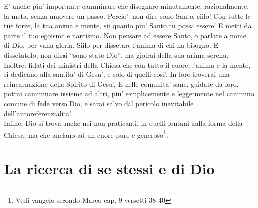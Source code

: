 E' anche piu' importante camminare che disegnare minutamente, razionalmente, la meta, senza muovere un passo.  Percio': non dire sono Santo, siilo!  Con tutte le tue forze, la tua anima e mente, sii quanto piu' Santo tu possa essere! E metti da parte il tuo egoismo e narcismo.  Non pensare ad essere Santo, o parlare a nome di Dio, per vana gloria. Siilo per dissetare l'anima di chi ha bisogno. E dissetatolo, non dirai ``sono stato Dio'', ma gioirai della sua anima serena.\\
Inoltre: fidati dei ministri della Chiesa che con tutto il cuore, l'anima e la mente, si dedicano alla santita' di Gesu', e solo di quelli cosi'. In loro troverai una reincarnazione dello Spirito di Gesu'. E nelle comunita' sane, guidate da loro, potrai camminare insieme ad altri, piu' semplicemente e leggermente nel cammino comune di fede verso Dio, e sarai salvo dal pericolo inevitabile dell'autoreferenzialita'.\\
Infine, Dio si trova anche nei non praticanti, in quelli lontani dalla forma della Chiesa, ma che anelano ad un cuore puro e generoso\footnote{Vedi vangelo secondo Marco cap. 9 versetti 38-40}.

\section{La ricerca di se stessi e di Dio}
\label{laricerca}

